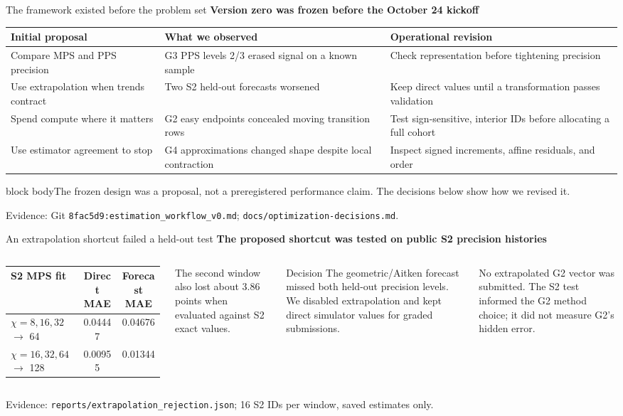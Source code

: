 \documentclass[aspectratio=169,11pt]{beamer}
\newcommand{\eyebrow}[1]{{\small\color{teal}\bfseries #1}\par\vspace{.18cm}}
\newcommand{\source}[1]{\vfill{\tiny\color{muted}Evidence: #1}}
\newcommand{\caveat}[1]{\begin{beamercolorbox}[sep=.16cm,wd=\linewidth]{block body}\small #1\end{beamercolorbox}}
\begin{document}
\begin{frame}{The framework existed before the problem set}
\eyebrow{Version zero was frozen before the October 24 kickoff}
\small
\begin{tabular}{@{}p{}p{}p{}@{}}
\toprule
Initial proposal & What we observed & Operational revision \\
\midrule
Compare MPS and PPS precision & G3 PPS levels 2/3 erased signal on a known sample & Check representation before tightening precision \\
\addlinespace[.14cm]
Use extrapolation when trends contract & Two S2 held-out forecasts worsened & Keep direct values until a transformation passes validation \\
\addlinespace[.14cm]
Spend compute where it matters & G2 easy endpoints concealed moving transition rows & Test sign-sensitive, interior IDs before allocating a full cohort \\
\addlinespace[.14cm]
Use estimator agreement to stop & G4 approximations changed shape despite local contraction & Inspect signed increments, affine residuals, and order \\
\bottomrule
\end{tabular}
\vspace{.32cm}
\caveat{The frozen design was a proposal, not a preregistered performance claim. The decisions below show how we revised it.}
\source{Git \texttt{8fac5d9:estimation\_workflow\_v0.md}; \texttt{docs/optimization-decisions.md}.}
\end{frame}

\begin{frame}{An extrapolation shortcut failed a held-out test}
\eyebrow{The proposed shortcut was tested on public S2 precision histories}
\begin{columns}[T,onlytextwidth]
\small
\begin{tabular}{@{}lcc@{}}
\toprule
S2 MPS fit & Direct MAE & Forecast MAE \\
\midrule
$\chi=8,16,32$ $\rightarrow$ 64 & 0.04447 & \alert{0.04676} \\
$\chi=16,32,64$ $\rightarrow$ 128 & 0.00955 & \alert{0.01344} \\
\bottomrule
\end{tabular}
\vspace{.35cm}
\small The second window also lost about 3.86 points when evaluated against S2 exact values.
\begin{block}{Decision}
The geometric/Aitken forecast missed both held-out precision levels. We disabled extrapolation and kept direct simulator values for graded submissions.
\end{block}
\vspace{.22cm}
\small No extrapolated G2 vector was submitted. The S2 test informed the G2 method choice; it did not measure G2's hidden error.
\end{columns}
\source{\texttt{reports/extrapolation\_rejection.json}; 16 S2 IDs per window, saved estimates only.}
\end{frame}
\end{document}

